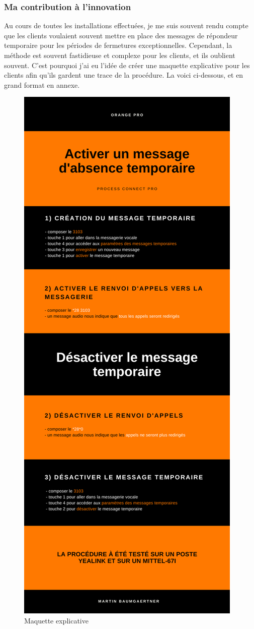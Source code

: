 \documentclass[12pt, a4paper]{article}
\begin{document}
\subsubsection{Ma contribution à l'innovation}
Au cours de toutes les installations effectuées, 
je me suis souvent rendu compte que les clients
voulaient souvent mettre en place des messages 
de répondeur temporaire pour les périodes
de fermetures exceptionnelles. Cependant,
la méthode est souvent fastidieuse et
complexe pour les clients, et ils oublient 
souvent. C'est pourquoi j'ai eu l'idée de
créer une maquette explicative pour les clients
afin qu'ils gardent une trace de la procédure. 
La voici ci-dessous, et en grand format en annexe.\\
\begin{figure}[h]
	\centering
	\includegraphics[scale=0.3]{img/maquette.png}
	\caption{Maquette explicative}
\end{figure}
\newpage
\end{document}
